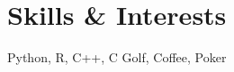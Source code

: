 \section{Skills \& Interests}
\resumeSectionStart

\skillsInterests
    {Python, R, C++, C}
    {Golf, Coffee, Poker}

\resumeSectionEnd
